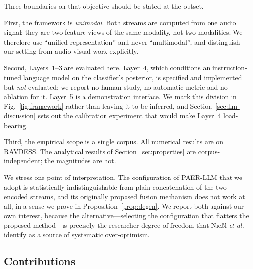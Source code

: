 \documentclass[journal,onecolumn,11pt,draftclsnofoot]{IEEEtran}   %
\begin{document}
Three boundaries on that objective should be stated at the outset.

First, the framework is \emph{unimodal}. Both streams are computed from one
audio signal; they are two feature views of the same modality, not two
modalities. We therefore use ``unified representation'' and never
``multimodal'', and distinguish our setting from audio-visual work explicitly.

Second, Layers~1--3 are evaluated here. Layer~4, which conditions an
instruction-tuned language model on the classifier's posterior, is specified
and implemented but \emph{not} evaluated: we report no human study, no
automatic metric and no ablation for it. Layer~5 is a demonstration interface.
We mark this division in Fig.~\ref{fig:framework} rather than leaving it to be
inferred, and Section~\ref{sec:llm-discussion} sets out the calibration
experiment that would make Layer~4 load-bearing.

Third, the empirical scope is a single corpus. All numerical results are on
RAVDESS. The analytical results of Section~\ref{sec:properties} are
corpus-independent; the magnitudes are not.

We stress one point of interpretation. The configuration of PAER-LLM that we
adopt is statistically indistinguishable from plain concatenation of the two
encoded streams, and its originally proposed fusion mechanism does not work at
all, in a sense we prove in Proposition~\ref{prop:degen}. We report both
against our own interest, because the alternative---selecting the configuration
that flatters the proposed method---is precisely the researcher degree of
freedom that Nie{\ss}l \emph{et al.} \cite{niessl2022overoptimism} identify as a
source of systematic over-optimism.

\subsection{Contributions}
\label{sec:contributions}
\end{document}
